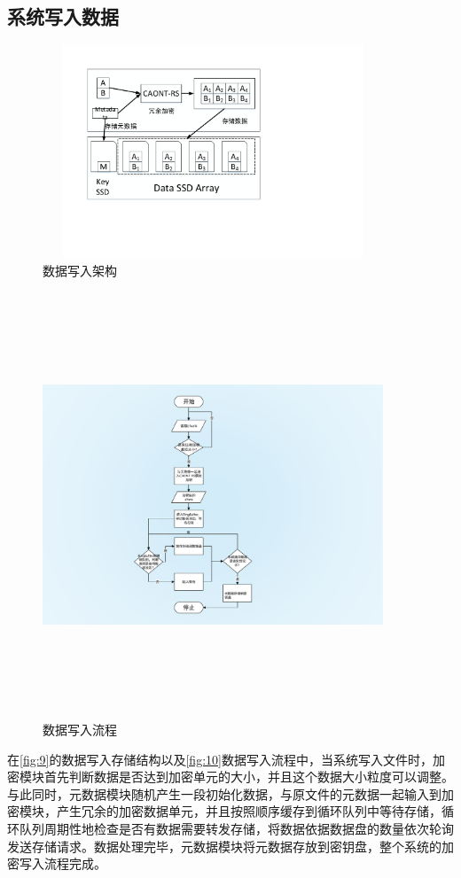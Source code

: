 \subsection{系统写入数据}
\begin{figure}[htb]
	\centering
	\includegraphics[width=4in,height=2.5in]{Pics/data-write-st.pdf}
	\caption{数据写入架构}\label{fig:9}
\end{figure}
\begin{figure}[H]
	\centering
	\includegraphics[width=4in,height=5in]{Pics/data-write-pr.pdf}
	\caption{数据写入流程}\label{fig:10}
\end{figure}
在\autoref{fig:9}的数据写入存储结构以及\autoref{fig:10}数据写入流程中，当系统写入文件时，加密模块首先判断数据是否达到加密单元的大小，并且这个数据大小粒度可以调整。与此同时，元数据模块随机产生一段初始化数据，与原文件的元数据一起输入到加密模块，产生冗余的加密数据单元，并且按照顺序缓存到循环队列中等待存储，循环队列周期性地检查是否有数据需要转发存储，将数据依据数据盘的数量依次轮询发送存储请求。数据处理完毕，元数据模块将元数据存放到密钥盘，整个系统的加密写入流程完成。
